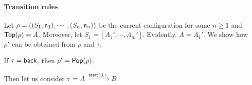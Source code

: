 

\smallskip

\paragraph{Transition rules} 


Let $\rho = ((S_1,\mathfrak{n}_1),\cdots,(S_n,\mathfrak{n}_n))$ be the current configuration for some $n \ge 1$ and $\mathsf{Top}(\rho) = A$. Moreover, let $S_1 = [A_1',\cdots,A_m']$. Evidently, $A = A_1'$. We show how $\rho'$ can be obtained from $\rho$ and $\tau$.
	
	If $\tau = {\mathsf{back} }$, then $\rho' = \mathsf{Pop}(\rho)$. 
	
	Then let us consider $\tau = A\xrightarrow{{\mathsf{start} }(\bot)}B$.
	
	
	
	
	
	
	
	
	
